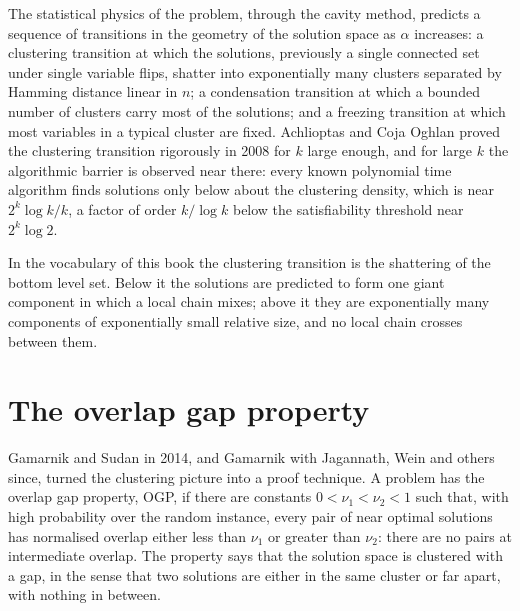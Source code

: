 The statistical physics of the problem, through the cavity method, predicts a sequence of transitions in the geometry of the solution space as $\alpha$ increases: a clustering transition at which the solutions, previously a single connected set under single variable flips, shatter into exponentially many clusters separated by Hamming distance linear in $n$; a condensation transition at which a bounded number of clusters carry most of the solutions; and a freezing transition at which most variables in a typical cluster are fixed. Achlioptas and Coja Oghlan proved the clustering transition rigorously in 2008 for $k$ large enough, and for large $k$ the algorithmic barrier is observed near there: every known polynomial time algorithm finds solutions only below about the clustering density, which is near $2^k \log k / k$, a factor of order $k / \log k$ below the satisfiability threshold near $2^k \log 2$.

In the vocabulary of this book the clustering transition is the shattering of the bottom level set. Below it the solutions are predicted to form one giant component in which a local chain mixes; above it they are exponentially many components of exponentially small relative size, and no local chain crosses between them.

\section{The overlap gap property}

Gamarnik and Sudan in 2014, and Gamarnik with Jagannath, Wein and others since, turned the clustering picture into a proof technique. A problem has the overlap gap property, OGP, if there are constants $0 < \nu_1 < \nu_2 < 1$ such that, with high probability over the random instance, every pair of near optimal solutions has normalised overlap either less than $\nu_1$ or greater than $\nu_2$: there are no pairs at intermediate overlap. The property says that the solution space is clustered with a gap, in the sense that two solutions are either in the same cluster or far apart, with nothing in between.

